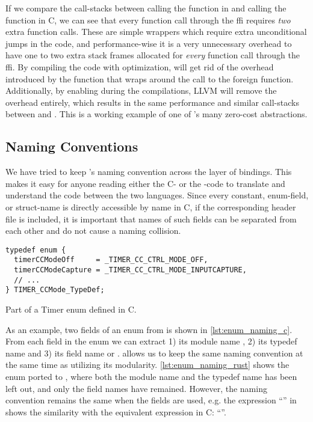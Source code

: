 If we compare the call-stacks between calling the  function in {\rust} and calling the  function in C, we can see that every function call through the \gls{ffi} requires \emph{two} extra function calls.
These are simple wrappers which require extra unconditional jumps in the code, and performance-wise it is a very unnecessary overhead to have one to two extra stack frames allocated for \emph{every} function call through the \gls{ffi}.
By compiling the code with optimization, {\rust} will get rid of the overhead introduced by the function that wraps around the call to the foreign function.
Additionally, by enabling  during the compilations, LLVM will remove the overhead entirely, which results in the same performance and similar call-stacks between {\C} and {\rust}.
This is a working example of one of {\rust}'s many zero-cost abstractions.

\subsection{Naming Conventions}

We have tried to keep \emlib's naming convention across the layer of bindings.
This makes it easy for anyone reading either the C- or the {\rust}-code to translate and understand the code between the two languages.
Since every constant, enum-field, or struct-name is directly accessible by name in C, if the corresponding header file is included, it is important that names of such fields can be separated from each other and do not cause a naming collision.

\begin{listing}[h]
\begin{verbatim}
typedef enum {
  timerCCModeOff     = _TIMER_CC_CTRL_MODE_OFF,
  timerCCModeCapture = _TIMER_CC_CTRL_MODE_INPUTCAPTURE,
  // ...
} TIMER_CCMode_TypeDef;
\end{verbatim}
\caption{Part of a Timer enum defined in C.}
\label{lst:enum_naming_c}
\end{listing}

As an example, two fields of an enum from  is shown in \autoref{lst:enum_naming_c}.
From each field in the enum we can extract 1) its module name , 2) its typedef name  and 3) its field name  or .
\rust allows us to keep the same naming convention at the same time as utilizing its modularity.
\autoref{lst:enum_naming_rust} shows the enum ported to {\rust}, where both the module name and the typedef name has been left out, and only the field names have remained.
However, the naming convention remains the same when the fields are used, e.g. the expression ``'' in {\rust} shows the similarity with the equivalent expression in C: ``''.

